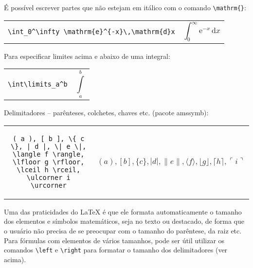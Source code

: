 \documentclass{scrartcl}
\begin{document}
\bigskip

É possível escrever partes que não estejam em itálico com o comando \verb+\mathrm{}+:



\begin{tabular}{cc}
\begin{minipage}{0.4\textwidth}
\verb+\int_0^\infty \mathrm{e}^{-x}\,\mathrm{d}x+
\end{minipage} & \begin{minipage}{0.4\textwidth}\[ \int_0^\infty \mathrm{e}^{-x}\,\mathrm{d}x \] \end{minipage}
\end{tabular}

\bigskip

Para especificar limites acima e abaixo de uma integral:



\begin{tabular}{cc}
\begin{minipage}{0.4\textwidth}
\verb+\int\limits_a^b+
\end{minipage} & \begin{minipage}{0.4\textwidth}\[ \int\limits_a^b \] \end{minipage}
\end{tabular}


Delimitadores -- parênteses, colchetes, chaves etc. (pacote \textsf{amssymb}):

\bigskip

\begin{tabular}{cl}
\begin{minipage}{0.5\textwidth}
\begin{verbatim}
( a ), [ b ], \{ c \}, | d |, \| e \|,
\langle f \rangle, \lfloor g \rfloor,
\lceil h \rceil, \ulcorner i \urcorner
\end{verbatim}
\end{minipage} & 
\begin{minipage}{0.3\textwidth}
\begin{displaymath}
( a ), [ b ], \{ c \}, | d |, \| e \|,
\langle f \rangle, \lfloor g \rfloor,
\lceil h \rceil, \ulcorner i \urcorner 
\end{displaymath}
 \end{minipage}
\end{tabular}

\bigskip


Uma das praticidades do \LaTeX{} é que ele formata automaticamente o tamanho dos elementos e símbolos matemáticos, seja no texto ou destacado, de forma que o usuário não precisa de se preocupar com o tamanho do parêntese, da raiz etc. Para fórmulas com elementos de vários tamanhos, pode ser útil utilizar os comandos \verb+\left+ e \verb+\right+ para formatar o tamanho dos delimitadores (ver acima). 
\end{document}

